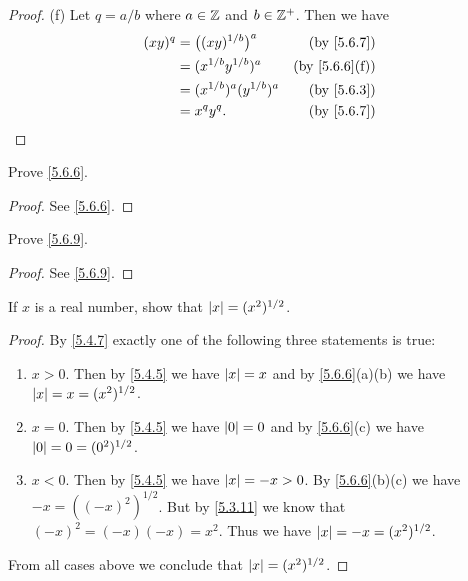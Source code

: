 \begin{proof}{(f)}
  Let \(q = a / b\) where \(a \in \mathbb{Z}\) and \(b \in \mathbb{Z}^+\).
  Then we have
  \begin{align*}
    (xy)^q & = \big((xy)^{1 / b}\big)^a    & \text{(by \cref{5.6.7})}    \\
           & = (x^{1 / b} y^{1 / b})^a     & \text{(by \cref{5.6.6}(f))} \\
           & = (x^{1 / b})^a (y^{1 / b})^a & \text{(by \cref{5.6.3})}    \\
           & = x^q y^q.                    & \text{(by \cref{5.6.7})}
  \end{align*}
\end{proof}

\exercisesection

\begin{ex}\label{ex:5.6.1}
  Prove \cref{5.6.6}.
\end{ex}

\begin{proof}
  See \cref{5.6.6}.
\end{proof}

\begin{ex}\label{ex:5.6.2}
  Prove \cref{5.6.9}.
\end{ex}

\begin{proof}
  See \cref{5.6.9}.
\end{proof}

\begin{ex}\label{ex:5.6.3}
  If \(x\) is a real number, show that \(\left\lvert x\right\rvert = (x^2)^{1 / 2}\).
\end{ex}

\begin{proof}
  By \cref{5.4.7} exactly one of the following three statements is true:
  \begin{enumerate}
    \item \(x > 0\).
          Then by \cref{5.4.5} we have \(\left\lvert x\right\rvert = x\) and by \cref{5.6.6}(a)(b) we have \(\left\lvert x\right\rvert = x = (x^2)^{1 / 2}\).
    \item \(x = 0\).
          Then by \cref{5.4.5} we have \(\left\lvert0\right\rvert = 0\) and by \cref{5.6.6}(c) we have \(\left\lvert0\right\rvert = 0 = (0^2)^{1 / 2}\).
    \item \(x < 0\).
          Then by \cref{5.4.5} we have \(\left\lvert x\right\rvert = -x > 0\).
          By \cref{5.6.6}(b)(c) we have \(-x = ((-x)^2)^{1 / 2}\).
          But by \cref{5.3.11} we know that \((-x)^2 = (-x)(-x) = x^2\).
          Thus we have \(\left\lvert x\right\rvert = -x = (x^2)^{1 / 2}\).
  \end{enumerate}
  From all cases above we conclude that \(\left\lvert x\right\rvert = (x^2)^{1 / 2}\).
\end{proof}